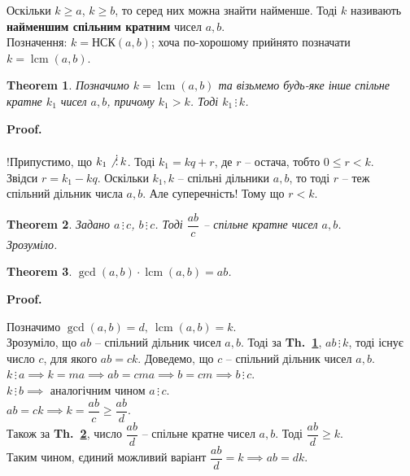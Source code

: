 \documentclass[a4paper, 10pt]{article}
\makeatletter
\def\qed{$\blacksquare$}
\newcommand\thref[1]{\textbf{Th.~\ref{#1}}}
\theoremstyle{theoremdd}
\newtheorem{theorem}{Theorem}[subsection]
\theoremstyle{theoremdd}
\theoremstyle{theoremdd}
\theoremstyle{theoremdd}
\theoremstyle{theoremdd}
\theoremstyle{theoremdd}
\theoremstyle{theoremdd}
\theoremstyle{theoremdd}
\renewenvironment{proof}[1][Proof.\\]{\par
\pushQED{\hfill \qed}%
\normalfont \topsep6\p@\@plus6\p@\relax
\trivlist
\item\relax
{\bfseries
#1\@addpunct{.}}\hspace\labelsep\ignorespaces
}{%
\popQED\endtrivlist\@endpefalse
}
\newcommand\divisibleBy{\, \vdots \,}
\DeclareMathOperator{\lcm}{lcm}
\makeatother
\begin{document}
Оскільки $k \geq a$, $k \geq b$, то серед них можна знайти найменше. Тоді $k$ називають \textbf{найменшим спільним кратним} чисел $a,b$.\\
Позначення: $k = \text{НСК}(a,b)$; хоча по-хорошому прийнято позначати $k = \lcm(a,b)$.

\begin{theorem}
\label{another_common_multiple_is_divisible_by_lcm}
Позначимо $k = \lcm(a,b)$ та візьмемо будь-яке інше спільне кратне $k_1$ чисел $a,b$, причому $k_1 > k$. Тоді $k_1 \divisibleBy k$.
\end{theorem}

\begin{proof}
!Припустимо, що $k_1 \not\divisibleBy k$. Тоді $k_1 = kq+r$, де $r$ -- остача, тобто $0 \leq r < k$.\\
Звідси $r = k_1 - kq$. Оскільки $k_1,k$ -- спільні дільники $a,b$, то тоді $r$ -- теж спільний дільник числа $a,b$. Але суперечність! Тому що $r < k$.
\end{proof}

\begin{theorem}
\label{about_common_multiple}
Задано $a \divisibleBy c$, $b \divisibleBy c$. Тоді $\dfrac{ab}{c}$ -- спільне кратне чисел $a,b$.\\
\textit{Зрозуміло.}
\end{theorem}

\begin{theorem}
$\gcd(a,b) \cdot \lcm(a,b) = ab$.
\end{theorem}

\begin{proof}
Позначимо $\gcd(a,b) = d,\ \lcm(a,b) = k$.\\
Зрозуміло, що $ab$ -- спільний дільник чисел $a,b$. Тоді за \thref{another_common_multiple_is_divisible_by_lcm}, $ab \divisibleBy k$, тоді існує число $c$, для якого $ab = ck$. Доведемо, що $c$ -- спільний дільник чисел $a,b$.\\
$k \divisibleBy a \implies k = ma \implies ab = cma \implies b = cm \implies b \divisibleBy c$.\\
$k \divisibleBy b \implies$ аналогічним чином $a \divisibleBy c$.\\
$ab = ck \implies k = \dfrac{ab}{c} \geq \dfrac{ab}{d}$.\\
Також за \thref{about_common_multiple}, число $\dfrac{ab}{d}$ -- спільне кратне чисел $a,b$. Тоді $\dfrac{ab}{d} \geq k$.\\
Таким чином, єдиний можливий варіант $\dfrac{ab}{d} = k \implies ab = dk$.
\end{proof}
\end{document}

